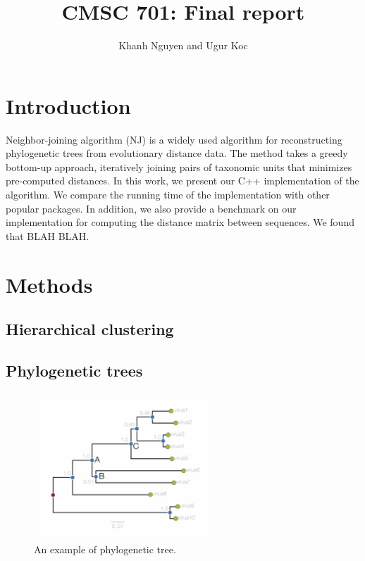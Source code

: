 \documentclass[11pt,letterpaper]{article}
\title{
   CMSC 701: Final report
}
\author{
	Khanh Nguyen and Ugur Koc
}
\theoremstyle{definition}
\begin{document}
\maketitle

\section{Introduction}

Neighbor-joining algorithm (NJ) is a widely used algorithm for reconstructing phylogenetic trees from evolutionary distance data. The method takes a greedy bottom-up approach, iteratively joining pairs of taxonomic units that minimizes pre-computed distances. In this work, we present our C++ implementation of the algorithm. We compare the running time of the implementation with other popular packages. In addition, we also provide a benchmark on our implementation for computing the distance matrix between sequences. We found that BLAH BLAH.

\section{Methods}

\subsection{Hierarchical clustering}

\subsection{Phylogenetic trees}

\begin{figure}[h]
  \centering
  \includegraphics[width=0.6\textwidth]{phylogram_1a.png}
  \caption{An example of phylogenetic tree.}
  \label{fig:phytree}
\end{figure}
\end{document}
